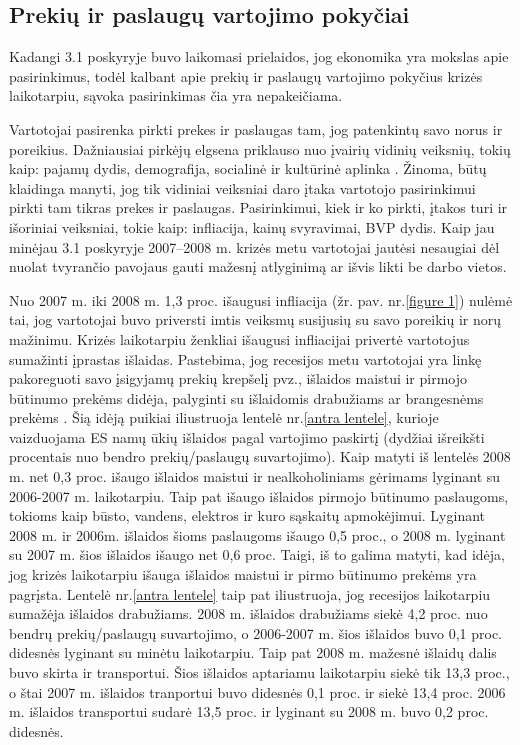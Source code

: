 \documentclass[l1pt, titlepage]{article}
\begin{document}
\subsection{Prekių ir paslaugų vartojimo pokyčiai}
Kadangi 3.1 poskyryje buvo laikomasi prielaidos, jog ekonomika yra mokslas apie pasirinkimus, todėl kalbant apie prekių ir paslaugų vartojimo pokyčius krizės laikotarpiu, sąvoka pasirinkimas čia yra nepakeičiama. 

Vartotojai pasirenka pirkti prekes ir paslaugas tam, jog patenkintų savo norus ir poreikius. Dažniausiai pirkėjų elgsena priklauso nuo įvairių  vidinių veiksnių, tokių kaip: pajamų dydis, demografija, socialinė ir kultūrinė aplinka \cite{mansoor2011global}. Žinoma, būtų  klaidinga manyti, jog tik vidiniai veiksniai daro įtaka vartotojo pasirinkimui pirkti tam tikras prekes ir paslaugas. Pasirinkimui, kiek ir ko pirkti, įtakos turi ir išoriniai veiksniai, tokie kaip: infliacija, kainų svyravimai, BVP dydis. Kaip jau minėjau 3.1 poskyryje 2007–2008 m. krizės metu vartotojai jautėsi nesaugiai dėl nuolat tvyrančio pavojaus gauti mažesnį atlyginimą ar išvis likti be darbo vietos.

Nuo 2007 m. iki 2008 m. 1,3 proc. išaugusi infliacija (žr. pav. nr.\ref{figure 1}) nulėmė tai, jog vartotojai buvo priversti imtis veiksmų susijusių su savo poreikių ir norų mažinimu. Krizės laikotarpiu ženkliai išaugusi infliacijai privertė vartotojus sumažinti įprastas išlaidas. Pastebima, jog recesijos metu vartotojai yra linkę pakoreguoti savo įsigyjamų prekių krepšelį pvz., išlaidos maistui ir pirmojo būtinumo prekėms didėja, palyginti su išlaidomis drabužiams ar brangesnėms prekėms \cite{mansoor2011global}. Šią idėją puikiai iliustruoja lentelė nr.\ref{antra lentele}, kurioje vaizduojama ES namų ūkių išlaidos pagal vartojimo paskirtį (dydžiai išreikšti procentais nuo bendro prekių/paslaugų suvartojimo). Kaip matyti iš lentelės 2008 m. net 0,3 proc. išaugo išlaidos maistui ir nealkoholiniams gėrimams lyginant su 2006-2007 m. laikotarpiu. Taip pat išaugo išlaidos pirmojo būtinumo paslaugoms, tokioms kaip būsto, vandens, elektros ir kuro sąskaitų apmokėjimui. Lyginant 2008 m. ir 2006m. išlaidos šioms paslaugoms išaugo 0,5 proc., o 2008 m. lyginant su 2007 m. šios išlaidos išaugo net 0,6 proc. Taigi, iš to galima matyti, kad idėja, jog krizės laikotarpiu išauga išlaidos maistui ir pirmo būtinumo prekėms yra pagrįsta. 
Lentelė nr.\ref{antra lentele} taip pat iliustruoja, jog recesijos laikotarpiu sumažėja išlaidos drabužiams. 2008 m. išlaidos drabužiams siekė 4,2 proc. nuo bendrų prekių/paslaugų suvartojimo, o 2006-2007 m. šios išlaidos buvo 0,1 proc.  didesnės lyginant su minėtu laikotarpiu. Taip pat 2008 m. mažesnė išlaidų dalis buvo skirta ir transportui. Šios išlaidos aptariamu laikotarpiu siekė tik 13,3 proc., o štai 2007 m. išlaidos tranportui buvo didesnės 0,1 proc. ir siekė 13,4 proc. 2006 m. išlaidos transportui sudarė 13,5 proc. ir lyginant su 2008 m. buvo 0,2 proc. didesnės. 
\end{document}
